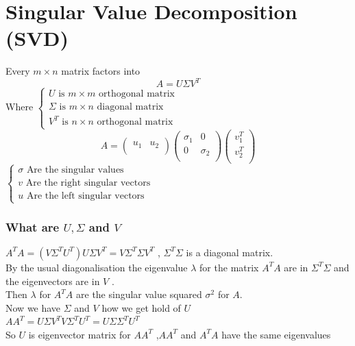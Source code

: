 \documentclass[12pt,oneside]{book}
\begin{document}
\section{Singular Value Decomposition (SVD)}
Every $m\times n$ matrix factors into
\[A = U\Sigma V^T\]
Where $\begin{cases}
        U  \text{ is } m\times m \text{ orthogonal matrix}   \\
        \Sigma \text{ is } m\times n \text{ diagonal matrix} \\
        V^T \text{ is } n\times n \text{ orthogonal matrix }
    \end{cases}$
\[ A =  \left( \begin{matrix}
            u_1 & u_2 \\
        \end{matrix}\right) \left( \begin{matrix}
            \sigma_1 & 0        \\
            0        & \sigma_2 \\
        \end{matrix}\right) \left( \begin{matrix}
            v_1^T \\
            v_2^T \\
        \end{matrix}\right)\]
$\begin{cases}
        \sigma \text{ Are the singular values }  \\
        v \text{ Are the right singular vectors} \\
        u \text{ Are the left singular vectors }
    \end{cases}$
\subsubsection{What are $ U ,\Sigma$ and $V$}
$A^TA = (V\Sigma^TU^T)U\Sigma V^T = V\Sigma^T\Sigma V^T$ , $\Sigma^T\Sigma$ is a diagonal matrix.\\
By the usual diagonalisation the eigenvalue $\lambda$ for the matrix $A^TA$ are in $\Sigma^T\Sigma$ and the eigenvectors are in $V$ .\\
Then $\lambda$ for $A^TA$ are the singular value squared $\sigma^2$ for $A$.\\
Now we have $\Sigma $ and $V$ how we get hold of $U$\\
$AA^T = U\Sigma V^T V \Sigma^T U^T = U\Sigma\Sigma^T U^T $\\
So $U $ is eigenvector matrix for $AA^T$ ,$AA^T $ and $A^TA$ have the same eigenvalues\\
\end{document}
